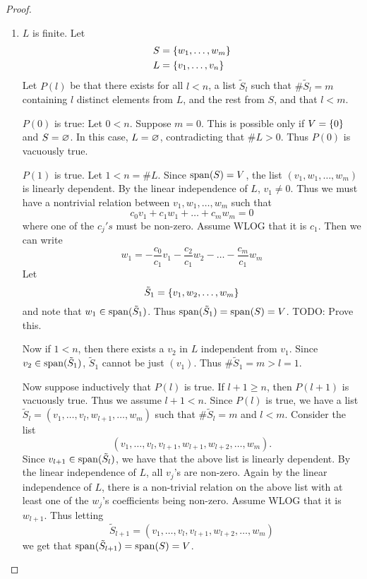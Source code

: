 \begin{proof} \leavevmode
    \begin{enumerate}[label=(Case \arabic*)]
        \item $L$ is finite.
        Let
        \begin{align*}
            S &= \set{w_{1}, \dots, w_{m}} \\
            L &= \set{v_{1}, \dots, v_{n}}
        \end{align*}
        Let $P(l)$ be that there exists for all $l < n$, a list $\tilde{S}_{l}$ such that $\# \tilde{S}_{l} = m$ containing $l$ distinct elements from $L$, and the rest from $S$, and that $l < m$.

        $P(0)$ is true: Let $0 < n$.
        Suppose $m = 0$.
        This is possible only if $V = \set{0}$ and $S = \varnothing$.
        In this case, $L = \varnothing$, contradicting that $\# L > 0$.
        Thus $P(0)$ is vacuously true.

        $P(1)$ is true. Let $1 < n = \# L$.
        Since $\operatorname{span}(S) = V$, the list $(v_{1}, w_{1}, \dots, w_{m})$ is linearly dependent.
        By the linear independence of $L$, $v_{1} \neq 0$.
        Thus we must have a nontrivial relation between $v_{1}, w_{1}, \dots, w_{m}$ such that \[
            c_{0} v_{1} + c_{1} w_{1} + \dots + c_{m} w_{m} = 0
        \] where one of the $c_{j}'s$ must be non-zero.
        Assume WLOG that it is $c_{1}$.
        Then we can write \[
            w_{1} = - \frac{c_{0}}{c_{1}} v_{1} - \frac{c_{2}}{c_{1}} w_{2} - \dots - \frac{c_{m}}{c_{1}} w_{m}
        \] Let \[
            \tilde{S}_{1} = \set{v_{1}, w_{2}, \dots, w_{m}}
        \] and note that $w_{1} \in \operatorname{span}(\tilde{S}_{1})$.
        Thus $\operatorname{span}(\tilde{S}_{1}) = \operatorname{span}(S) = V$. \textcolor{red!70!black}{TODO: Prove this.}

        Now if $1 < n$, then there exists a $v_{2}$ in $L$ independent from $v_{1}$.
        Since $v_{2} \in \operatorname{span}(\tilde{S}_{1})$, $\tilde{S}_{1}$ cannot be just $(v_{1})$.
        Thus $\# \tilde{S}_{1} = m > l = 1$.

        Now suppose inductively that $P(l)$ is true.
        If $l + 1 \geq n$, then $P(l + 1)$ is vacuously true.
        Thus we assume $l + 1 < n$.
        Since $P(l)$ is true, we have a list $\tilde{S}_{l} = (v_{1}, \dots, v_{l}, w_{l + 1}, \dots, w_{m})$ such that $\# \tilde{S}_{l} = m$ and $l < m$.
        Consider the list \[
            (v_{1}, \dots, v_{l}, v_{l + 1}, w_{l + 1}, w_{l + 2}, \dots, w_{m}).
        \] Since $v_{l + 1} \in \operatorname{span}(\tilde{S}_{l})$, we have that the above list is linearly dependent.
        By the linear independence of $L$, all $v_{j}$'s are non-zero.
        Again by the linear independence of $L$, there is a non-trivial relation on the above list with at least one of the $w_{j}$'s coefficients being non-zero.
        Assume WLOG that it is $w_{l + 1}$.
        Thus letting \[
            \tilde{S}_{l + 1} = (v_{1}, \dots, v_{l}, v_{l + 1}, w_{l + 2}, \dots, w_{m})
        \] we get that $\operatorname{span}(\tilde{S}_{l + 1}) = \operatorname{span}(S) = V$.


\end{enumerate}
\end{proof}

